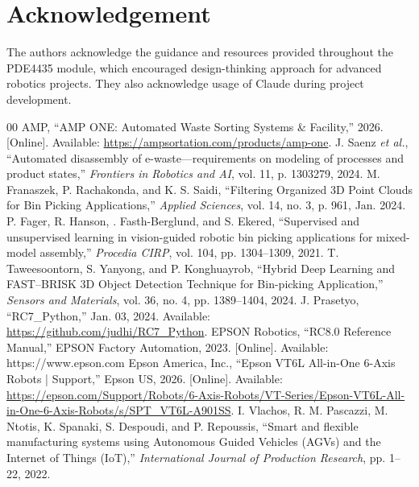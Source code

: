 \documentclass[conference]{IEEEtran}
\begin{document}
\section*{Acknowledgement}
The authors acknowledge the guidance and resources provided throughout the PDE4435 module, which encouraged design-thinking approach for advanced robotics projects. They also acknowledge usage of Claude during project development.

\begin{thebibliography}{00}
AMP, ``AMP ONE: Automated Waste Sorting Systems \& Facility,'' 2026. [Online]. Available: \url{https://ampsortation.com/products/amp-one}.
J. Saenz \textit{et al.}, ``Automated disassembly of e-waste—requirements on modeling of processes and product states,'' \textit{Frontiers in Robotics and AI}, vol. 11, p. 1303279, 2024.
M. Franaszek, P. Rachakonda, and K. S. Saidi, ``Filtering Organized 3D Point Clouds for Bin Picking Applications,'' \textit{Applied Sciences}, vol. 14, no. 3, p. 961, Jan. 2024.
P. Fager, R. Hanson, \text{\AA}. Fasth-Berglund, and S. Ekered, ``Supervised and unsupervised learning in vision-guided robotic bin picking applications for mixed-model assembly,'' \textit{Procedia CIRP}, vol. 104, pp. 1304--1309, 2021.
T. Taweesoontorn, S. Yanyong, and P. Konghuayrob, ``Hybrid Deep Learning and FAST–BRISK 3D Object Detection Technique for Bin-picking Application,'' \textit{Sensors and Materials}, vol. 36, no. 4, pp. 1389--1404, 2024.
J. Prasetyo, ``RC7\_Python,'' Jan. 03, 2024.  Available: \url{https://github.com/judhi/RC7_Python}.
 EPSON Robotics, ``RC8.0 Reference Manual,'' EPSON Factory Automation, 2023. [Online]. Available: https://www.epson.com
Epson America, Inc., ``Epson VT6L All-in-One 6-Axis Robots | Support,'' Epson US, 2026. [Online]. Available: \url{https://epson.com/Support/Robots/6-Axis-Robots/VT-Series/Epson-VT6L-All-in-One-6-Axis-Robots/s/SPT_VT6L-A901SS}.
I. Vlachos, R. M. Pascazzi, M. Ntotis, K. Spanaki, S. Despoudi, and P. Repoussis, ``Smart and flexible manufacturing systems using Autonomous Guided Vehicles (AGVs) and the Internet of Things (IoT),'' \textit{International Journal of Production Research}, pp. 1--22, 2022.
\end{thebibliography}
\end{document}
